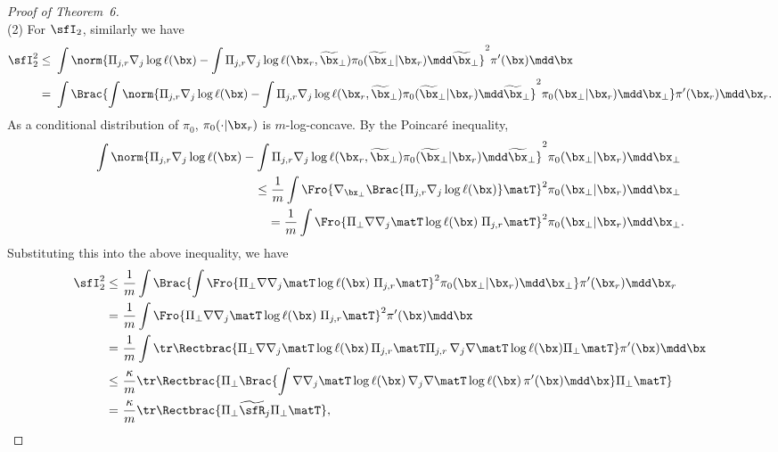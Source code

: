 \documentclass[11pt]{article}
\begin{document}
\begin{proof}[Proof of Theorem~6]
\ \\[-5pt]
\noindent
(2) For $\sfI_2$, similarly we have
{\small \begin{align*}
    \sfI_2^2 \le~& \int \norm{ \Pi_{j,r} \nabla_j \log \ell (\bx) - \int \Pi_{j,r} \nabla_j \log \ell(\bx_r,\widetilde{\bx}_\bot) \pi_0(\widetilde{\bx}_\bot|\bx_r) \mdd \widetilde{\bx}_\bot }^2 \pi'(\bx) \mdd \bx  \\
    =~& \int \Brac{ \int  \norm{ \Pi_{j,r} \nabla_j \log \ell (\bx) - \int \Pi_{j,r} \nabla_j \log \ell(\bx_r,\widetilde{\bx}_\bot) \pi_0(\widetilde{\bx}_\bot|\bx_r) \mdd \widetilde{\bx}_\bot }^2 \pi_0(\bx_\bot|\bx_r) \mdd \bx_\bot } \pi'(\bx_r) \mdd \bx_r.  
\end{align*}}
As a conditional distribution of $\pi_0$, $\pi_0(\cdot|\bx_r)$ is $m$-log-concave. By the Poincar\'e inequality,
\begin{align*}
    \int \norm{ \Pi_{j,r} \nabla_j \log \ell (\bx) - \int \Pi_{j,r} \nabla_j \log \ell(\bx_r,\widetilde{\bx}_\bot) \pi_0(\widetilde{\bx}_\bot|\bx_r) \mdd \widetilde{\bx}_\bot }^2 \pi_0(\bx_\bot|\bx_r) \mdd \bx_\bot & \\
    \le \frac{1}{m} \int \Fro{ \nabla_{\bx_\bot} \Brac{ \Pi_{j,r} \nabla_j \log \ell (\bx)}\matT  }^2 \pi_0(\bx_\bot|\bx_r) \mdd \bx_\bot& \\
    = \frac{1}{m} \int \Fro{ \Pi_\bot \nabla \nabla_j\matT \log \ell (\bx) \; \Pi_{j,r}\matT }^2 \pi_0(\bx_\bot|\bx_r) \mdd \bx_\bot&.
\end{align*}
Substituting this into the above inequality, we have 
\begin{equation}
\label{eqn:pf_LLIS_I2}
\begin{split}
    \sfI_2^2 \le~& \frac{1}{m} \int \Brac{ \int \Fro{ \Pi_\bot \nabla \nabla_j\matT \log \ell (\bx) \; \Pi_{j,r}\matT }^2 \pi_0(\bx_\bot|\bx_r) \mdd \bx_\bot } \pi'(\bx_r) \mdd \bx_r \\
    =~& \frac{1}{m} \int \Fro{ \Pi_\bot \nabla \nabla_j\matT \log \ell (\bx) \; \Pi_{j,r}\matT }^2 \pi'(\bx) \mdd \bx \\
    =~& \frac{1}{m} \int \tr \Rectbrac{ \Pi_\bot \nabla \nabla_j\matT \log \ell(\bx) \, \Pi_{j,r}\matT \Pi_{j,r} \, \nabla_j \nabla\matT \log \ell(\bx) \Pi_\bot\matT } \pi'(\bx) \mdd \bx \\
    \le~& \frac{\kappa}{m} \tr \Rectbrac{ \Pi_\bot \Brac{ \int \nabla \nabla_j\matT \log \ell(\bx) \, \nabla_j \nabla\matT \log \ell(\bx)\, \pi'(\bx) \mdd \bx } \Pi_\bot\matT } \\
    =~&\frac{\kappa}{m} \tr \Rectbrac{ \Pi_\bot \widetilde{\sfR}_j \Pi_\bot\matT },

\end{split}
\end{equation}
\end{proof}
\end{document}
